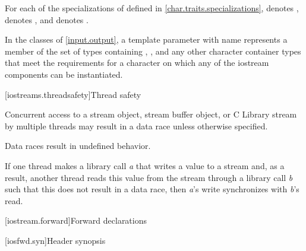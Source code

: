 \pnum
\begin{note}
For each of the specializations of  defined in
\ref{char.traits.specializations},
 denotes ,
 denotes ,
and  denotes .
\end{note}

\pnum
In the classes of \ref{input.output}, a template parameter with name
 represents a member of the set of types containing , ,
and any other 
character container types
that meet the requirements for a character on which any of
the iostream components can be instantiated.

[iostreams.threadsafety]{Thread safety}

\pnum
Concurrent access to a stream object, stream buffer
object, or C Library stream by multiple threads may result in
a data race unless otherwise specified.
\begin{note}
Data races result in undefined behavior.
\end{note}

\pnum
If one thread makes a library call \textit{a} that writes a value to a stream
and, as a result, another thread reads this value from the stream through a
library call \textit{b} such that this does not result in a data race, then
\textit{a}'s write synchronizes with
\textit{b}'s read.

[iostream.forward]{Forward declarations}

[iosfwd.syn]{Header  synopsis}

